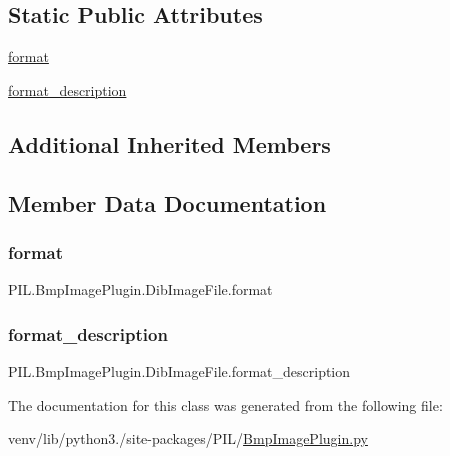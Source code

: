 \subsection*{Static Public Attributes}
\begin{DoxyCompactItemize}
\item 
\hyperlink{classPIL_1_1BmpImagePlugin_1_1DibImageFile_a55a8191ca58445d3bd367e4680204061}{format}
\item 
\hyperlink{classPIL_1_1BmpImagePlugin_1_1DibImageFile_ad730e02e51cc3d42a04c0efb3fe5d29b}{format\+\_\+description}
\end{DoxyCompactItemize}
\subsection*{Additional Inherited Members}


\subsection{Member Data Documentation}
\mbox{\label{classPIL_1_1BmpImagePlugin_1_1DibImageFile_a55a8191ca58445d3bd367e4680204061}} 
\subsubsection{\texorpdfstring{format}{format}}
{\footnotesize\ttfamily P\+I\+L.\+Bmp\+Image\+Plugin.\+Dib\+Image\+File.\+format\hspace{0.3cm}{\ttfamily [static]}}

\mbox{\label{classPIL_1_1BmpImagePlugin_1_1DibImageFile_ad730e02e51cc3d42a04c0efb3fe5d29b}} 
\subsubsection{\texorpdfstring{format\+\_\+description}{format\_description}}
{\footnotesize\ttfamily P\+I\+L.\+Bmp\+Image\+Plugin.\+Dib\+Image\+File.\+format\+\_\+description\hspace{0.3cm}{\ttfamily [static]}}



The documentation for this class was generated from the following file\+:\begin{DoxyCompactItemize}
\item 
venv/lib/python3./site-\/packages/\+P\+I\+L/\hyperlink{BmpImagePlugin_8py}{Bmp\+Image\+Plugin.\+py}\end{DoxyCompactItemize}
